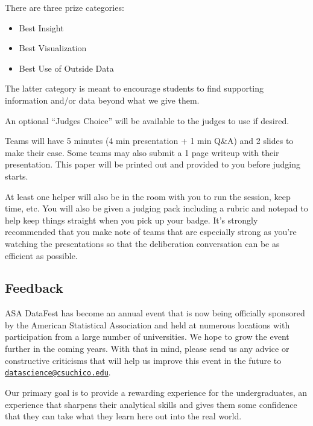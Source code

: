 \documentclass[]{article}
\providecommand{\tightlist}{%
  \setlength{\itemsep}{0pt}\setlength{\parskip}{0pt}}
\begin{document}
There are three prize categories:

\begin{itemize}
\tightlist
\item
  Best Insight
\item
  Best Visualization
\item
  Best Use of Outside Data
\end{itemize}

The latter category is meant to encourage students to find supporting
information and/or data beyond what we give them.

An optional ``Judges Choice'' will be available to the judges to use if
desired.

Teams will have 5 minutes (4 min presentation + 1 min Q\&A) and 2 slides
to make their case. Some teams may also submit a 1 page writeup with
their presentation. This paper will be printed out and provided to you
before judging starts.

At least one helper will also be in the room with you to run the
session, keep time, etc. You will also be given a judging pack including
a rubric and notepad to help keep things straight when you pick up your
badge. It's strongly recommended that you make note of teams that are
especially strong as you're watching the presentations so that the
deliberation conversation can be as efficient as possible.

\hypertarget{feedback}{%
\subsection{Feedback}\label{feedback}}

ASA DataFest has become an annual event that is now being officially
sponsored by the American Statistical Association and held at numerous
locations with participation from a large number of universities. We
hope to grow the event further in the coming years. With that in mind,
please send us any advice or constructive criticisms that will help us
improve this event in the future to
\href{mailto:datascience@csuchico.edu}{\nolinkurl{datascience@csuchico.edu}}.

Our primary goal is to provide a rewarding experience for the
undergraduates, an experience that sharpens their analytical skills and
gives them some confidence that they can take what they learn here out
into the real world.
\end{document}
